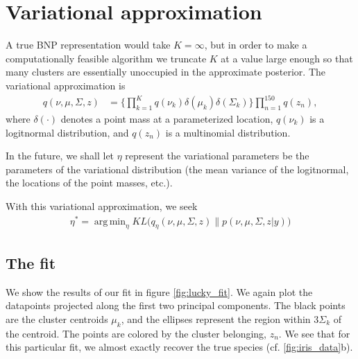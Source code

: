 \documentclass[a4paper]{article}
\DeclareMathOperator*{\argmin}{arg\,min}
\begin{document}
\section{Variational approximation}
A true BNP representation would take $K = \infty$, but in order to make a computationally feasible
algorithm we truncate $K$ at a value large enough so that many clusters are essentially unoccupied in
the approximate posterior. The variational approximation is
\begin{align}
q(\nu, \mu, \Sigma, z) & =
\Big\{\prod_{k=1}^{K}q\left(\nu_{k}\right)\delta\left(\mu_{k}\right)\delta\left(\Sigma_{k}\right)\Big\} \prod_{n=1}^{150}q\left(z_{n}\right),
\end{align}
where $\delta\left(\cdot\right)$ denotes a point mass at a parameterized
location, $q\left(\nu_{k}\right)$ is a logitnormal distribution, and $q\left(z_{n}\right)$
is a multinomial distribution.

In the future, we shall let $\eta$ represent the variational parameters be the parameters of the variational distribution
(the mean variance of the logitnormal, the locations of the point masses, etc.).

With this variational approximation, we seek
\begin{align}
\eta^* = \argmin_{\eta} KL\Big(q_\eta(\nu, \mu, \Sigma, z) \big\| p(\nu, \mu, \Sigma, z | y)\Big) \label{eq:kl_objective}
\end{align}

\subsection{The fit}
We show the results of our fit in figure \ref{fig:lucky_fit}. We again plot the datapoints
projected along the first two principal components. The black points are the cluster
centroids $\mu_k$, and the ellipses represent the region within $3\Sigma_k$ of the centroid.
The points are colored by the cluster belonging, $z_n$. We see that for this particular fit, we
almost exactly recover the true species (cf. \ref{fig:iris_data}b).
\end{document}
